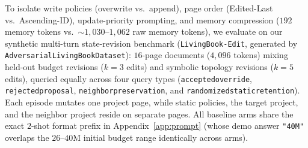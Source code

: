 \documentclass[11pt]{article}
\renewcommand{\_}{\origunderscore\allowbreak}
\begin{document}
To isolate write policies (overwrite vs.\ append), page order (Edited-Last vs.\ Ascending-ID), update-priority prompting, and memory compression ($192$ memory tokens vs.\ $\sim 1{,}030$--$1{,}062$ raw memory tokens), we evaluate on our synthetic multi-turn state-revision benchmark (\texttt{LivingBook-Edit}, generated by \texttt{AdversarialLivingBookDataset}): $16$-page documents ($4{,}096$ tokens) mixing held-out budget revisions ($k=3$ edits) and symbolic topology revisions ($k=5$ edits), queried equally across four query types (\texttt{accepted\_override}, \texttt{rejected\_proposal}, \texttt{neighbor\_preservation}, and \texttt{randomized\_static\_retention}). Each episode mutates one project page, while static policies, the target project, and the neighbor project reside on separate pages. All baseline arms share the exact $2$-shot format prefix in Appendix~\ref{app:prompt} (whose demo answer \texttt{"40M"} overlaps the $26$--$40\text{M}$ initial budget range identically across arms).
\end{document}
